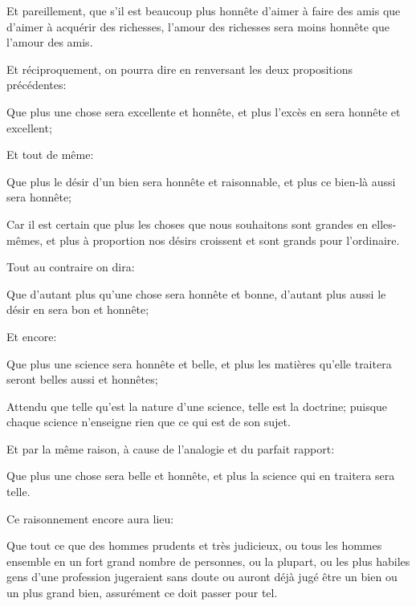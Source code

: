 Et pareillement, que s'il est beaucoup plus honnête d'aimer à faire des amis que d'aimer à acquérir des richesses,
l'amour des richesses sera moins honnête que l'amour des amis.

Et réciproquement, on pourra dire en renversant les deux propositions précédentes:

\begin{lieu}
	Que plus une chose sera excellente et honnête, et plus l'excès en sera honnête et excellent;
\end{lieu}

Et tout de même:

\begin{lieu}
	Que plus le désir d'un bien sera honnête et raisonnable, et plus ce bien-là aussi sera honnête;
\end{lieu}

Car il est certain que plus les choses que nous souhaitons sont grandes en elles-mêmes, et plus à proportion nos désirs
croissent et sont grands pour l'ordinaire.

\bigbreak

Tout au contraire on dira:

\begin{lieu}
	Que d'autant plus qu'une chose sera honnête et bonne, d'autant plus aussi le désir en sera bon et honnête;
\end{lieu}

Et encore:

\begin{lieu}
	Que plus une science sera honnête et belle, et plus les matières qu'elle traitera seront belles aussi et honnêtes;
\end{lieu}

Attendu que telle qu'est la nature d'une science, telle est la doctrine; puisque chaque science n'enseigne rien que ce qui
est de son sujet.

Et par la même raison, à cause de l'analogie et du parfait rapport:

\begin{lieu}
	Que plus une chose sera belle et honnête, et plus la science qui en traitera sera telle.
\end{lieu}

\bigbreak

Ce raisonnement encore aura lieu:

\begin{lieu}
	Que tout ce que des hommes prudents et très judicieux, ou tous les hommes ensemble en un fort grand nombre de personnes,
	ou la plupart, ou les plus habiles gens d'une profession jugeraient sans doute ou auront déjà jugé être un bien ou un plus
	grand bien, assurément ce doit passer pour tel.
\end{lieu}

